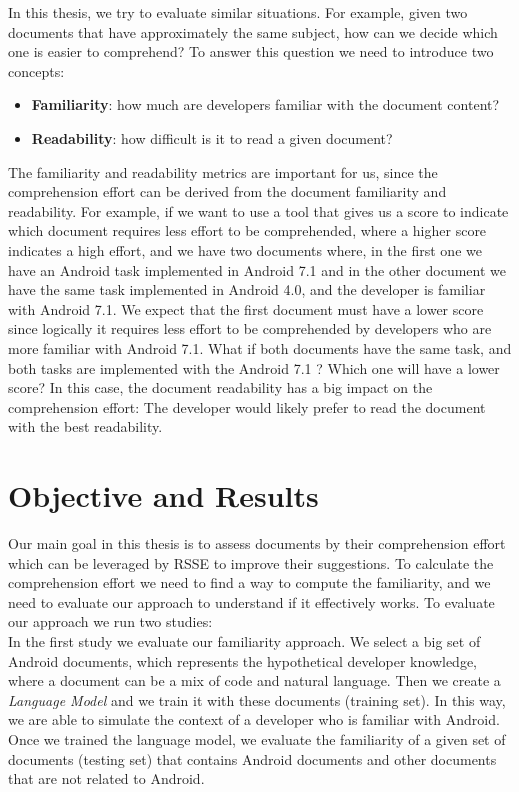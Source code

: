 \documentclass[12pt,mscthesis]{usiinfthesis}
\begin{document}
	In this thesis, we try to evaluate similar situations. For example, given two documents that have approximately the same subject, how can we decide which one is easier to comprehend? To answer this question we need to introduce two concepts:
	\begin{itemize}
	\item \textbf{Familiarity}: how much are developers familiar with the document content?
	\item \textbf{Readability}: how difficult is it to read a given document?
	\end{itemize}
	The familiarity and readability metrics are important for us, since the comprehension effort can be derived from the document familiarity and readability.
	For example, if we want to use a tool that gives us a score to indicate which document requires less effort to be comprehended, where a higher score indicates a high effort, and we have two documents where, in the first one we have an Android task implemented in Android 7.1 and in the other document we have the same task implemented in Android 4.0, and the developer is familiar with Android 7.1.
	We expect that the first document must have a lower score since logically it requires less effort to be comprehended by developers who are more familiar with Android 7.1.
	What if both documents have the same task, and both tasks are implemented with the Android 7.1 ? Which one will have a lower score? 
	In this case, the document readability has a big impact on the comprehension effort: The developer would likely prefer to read the document with the best readability.\\
	
	\section{Objective and Results}
	Our main goal in this thesis is to assess documents by their comprehension effort which can be leveraged by RSSE to improve their suggestions.
	To calculate the comprehension effort we need to find a way to compute the familiarity, and we need to evaluate our approach to understand if it effectively works.
	To evaluate our approach we run two studies:\\

	 In the first study we evaluate our familiarity approach. We select a big set of Android documents, which represents the hypothetical developer knowledge, where a document can be a mix of code and natural language. Then we create a \emph{ Language Model} \cite{Hindle:2012:NS:2337223.2337322} and we train it with these documents (training set). In this way, we are able to simulate the context of a developer who is familiar with Android. Once we trained the language model, we evaluate the familiarity of a given set of documents (testing set) that contains Android documents and other documents that are not related to Android.
\end{document}
